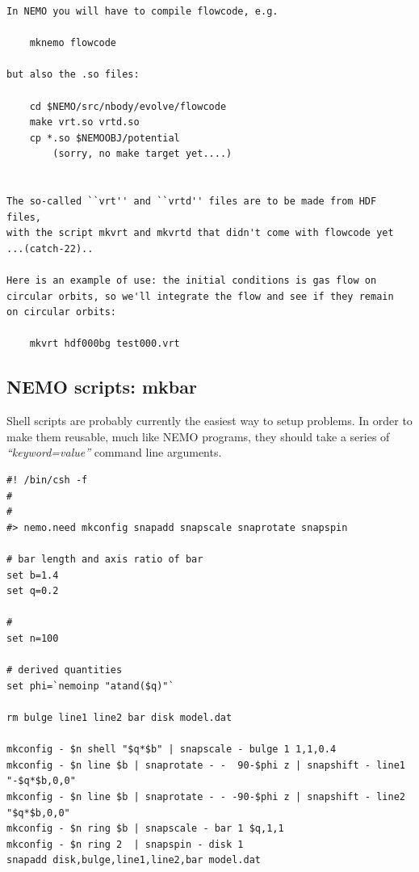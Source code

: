\documentclass[10pt,dvips]{article}
\begin{document}
\begin{verbatim}
In NEMO you will have to compile flowcode, e.g.

	mknemo flowcode

but also the .so files:

	cd $NEMO/src/nbody/evolve/flowcode
	make vrt.so vrtd.so
	cp *.so $NEMOOBJ/potential
		(sorry, no make target yet....)
	

The so-called ``vrt'' and ``vrtd'' files are to be made from HDF files,
with the script mkvrt and mkvrtd that didn't come with flowcode yet
...(catch-22)..

Here is an example of use: the initial conditions is gas flow on
circular orbits, so we'll integrate the flow and see if they remain
on circular orbits:

	mkvrt hdf000bg test000.vrt

\end{verbatim}

\subsection{NEMO scripts: mkbar}

Shell scripts are probably currently the easiest way to setup
problems. In order to make them reusable, much like NEMO
programs, they should take a series of {\it ``keyword=value''}
command line arguments.

\footnotesize\begin{verbatim}
#! /bin/csh -f
#
#
#> nemo.need mkconfig snapadd snapscale snaprotate snapspin

# bar length and axis ratio of bar
set b=1.4
set q=0.2

# 
set n=100

# derived quantities
set phi=`nemoinp "atand($q)"`

rm bulge line1 line2 bar disk model.dat

mkconfig - $n shell "$q*$b" | snapscale - bulge 1 1,1,0.4
mkconfig - $n line $b | snaprotate - -  90-$phi z | snapshift - line1 "-$q*$b,0,0"
mkconfig - $n line $b | snaprotate - - -90-$phi z | snapshift - line2 "$q*$b,0,0"
mkconfig - $n ring $b | snapscale - bar 1 $q,1,1
mkconfig - $n ring 2  | snapspin - disk 1
snapadd disk,bulge,line1,line2,bar model.dat 

\end{verbatim}\normalsize
\end{document}
